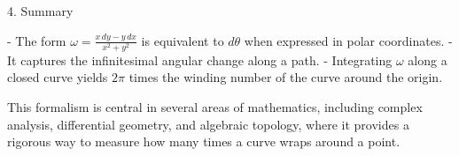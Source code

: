 \documentclass[11pt,openany]{article}
\begin{document}
 4. Summary

- The form \(\omega = \frac{x\,dy - y\,dx}{x^2+y^2}\) is equivalent to \(d\theta\) when expressed in polar coordinates.
- It captures the infinitesimal angular change along a path.
- Integrating \(\omega\) along a closed curve yields \(2\pi\) times the winding number of the curve around the origin.

This formalism is central in several areas of mathematics, including complex analysis, differential geometry, and algebraic topology, where it provides a rigorous way to measure how many times a curve wraps around a point.
\end{document}
